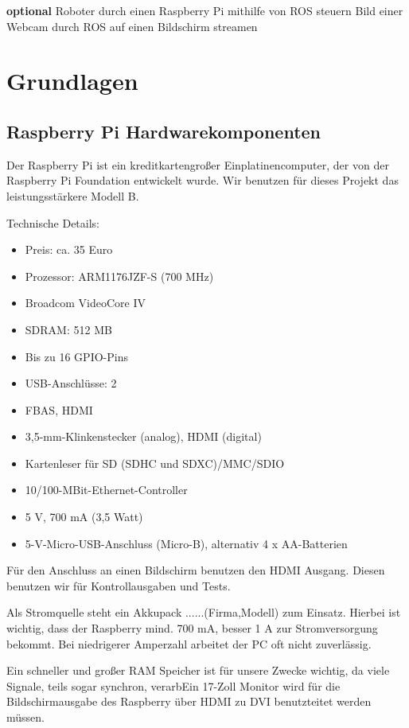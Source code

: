 \documentclass[12pt]{article}
\begin{document}
{\bf optional}
Roboter durch einen Raspberry Pi mithilfe von ROS steuern
Bild einer Webcam durch ROS auf einen Bildschirm streamen

\section{Grundlagen}

\subsection{Raspberry Pi Hardwarekomponenten}

Der Raspberry Pi ist ein kreditkartengroßer Einplatinencomputer, der von der Raspberry Pi Foundation entwickelt wurde.
Wir benutzen für dieses Projekt das leistungsstärkere Modell B.

Technische Details:

\begin{itemize}
\item Preis: ca. 35 Euro
\item Prozessor: ARM1176JZF-S (700 MHz)
\item Broadcom VideoCore IV
\item SDRAM: 512 MB
\item Bis zu 16 GPIO-Pins
\item USB-Anschlüsse: 2
\item FBAS, HDMI
\item 3,5-mm-Klinkenstecker (analog), HDMI (digital)
\item Kartenleser für SD (SDHC und SDXC)/MMC/SDIO
\item 10/100-MBit-Ethernet-Controller 
\item 5 V, 700 mA (3,5 Watt)
\item 5-V-Micro-USB-Anschluss (Micro-B), alternativ 4 x AA-Batterien
\end{itemize}

Für den Anschluss an einen Bildschirm benutzen den HDMI Ausgang.
Diesen benutzen wir für Kontrollausgaben und Tests.

Als Stromquelle steht ein Akkupack ......(Firma,Modell) zum Einsatz. 
Hierbei ist wichtig, dass der Raspberry mind. 700 mA, besser 1 A zur Stromversorgung bekommt. 
Bei niedrigerer Amperzahl arbeitet der PC oft nicht zuverlässig.

Ein schneller und großer RAM Speicher ist für unsere Zwecke wichtig, da viele Signale, teils sogar synchron, verarbEin 17-Zoll Monitor wird für die Bildschirmausgabe des Raspberry über HDMI zu DVI benutzteitet werden müssen.
\end{document}
